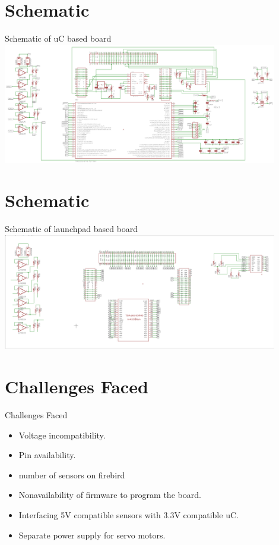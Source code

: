 \documentclass[10pt, a4paper]{beamer}
\begin{document}
\section{Schematic}
\begin{frame}{Schematic of uC based board}
{\includegraphics[width=12cm]{5.PNG}}
\end{frame}

\section{Schematic}
\begin{frame}{Schematic of launchpad based board}
{\includegraphics[width=12cm]{6.PNG}}
\end{frame}
\section{Challenges Faced}
\begin{frame}{Challenges Faced}
	\begin{itemize}
		\item Voltage incompatibility.
		\item Pin availability.
		\item number of sensors on firebird
		\item Nonavailability of firmware to program the board.
		\item Interfacing 5V compatible sensors with 3.3V compatible uC.
		\item Separate power supply for servo motors.
	\end{itemize}
\end{frame}
\end{document}

